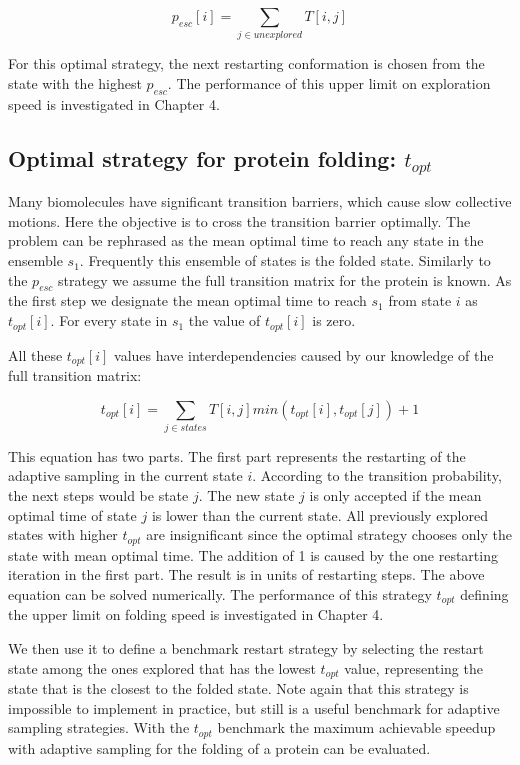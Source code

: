 $$p_{esc}[i]=\sum_{j \in unexplored}T[i, j]$$

For this optimal strategy, the next restarting conformation is chosen from the state with the highest $p_{esc}$. The performance of this upper limit on exploration speed is investigated in Chapter 4.

\subsection{Optimal strategy for protein folding: $t_{opt}$} 

Many biomolecules have significant transition barriers, which cause slow collective motions. Here the objective is to cross the transition barrier optimally.
The problem can be rephrased as the mean optimal time to reach any state in the ensemble  $s_1$. Frequently this ensemble of states is the folded state.  
Similarly to the $p_{esc}$ strategy we assume the full transition matrix for the protein is known. As the first step we designate the mean optimal time to reach $s_1$ from state $i$ as $t_{opt}[i]$.
For every state in $s_1$ the value of  $t_{opt}[i]$ is zero.

All these $t_{opt}[i]$ values have interdependencies caused by our knowledge of the full transition matrix:

$$t_{opt}[i]=\sum_{j \in states}T[i,j]min(t_{opt}[i],t_{opt}[j])+1$$

This equation has two parts. The first part represents the restarting of the adaptive sampling in the current state $i$. According to the transition probability, the next steps would be state $j$. The new state $j$ is only accepted if the mean optimal time of state $j$ is lower than the current state. All previously explored states with higher $t_{opt}$ are insignificant since the optimal strategy chooses only the state with mean optimal time. The addition of 1 is caused by the one restarting iteration in the first part. The result is in units of restarting steps. The above equation can be solved numerically. The performance of this strategy $t_{opt}$ defining the upper limit on folding speed is investigated in Chapter 4.

We then use it to define a benchmark restart strategy by
selecting the restart state among the ones explored that has the lowest
$t_{opt}$ value, representing the state that is the closest to the folded
state. Note again that this strategy is impossible to implement in
practice, but still is a useful benchmark for adaptive sampling strategies.
With the $t_{opt}$ benchmark the maximum achievable speedup with adaptive
sampling for the folding of a protein can be evaluated.


